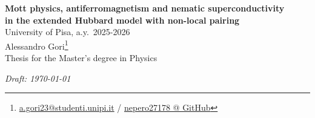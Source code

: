 \documentclass[a4paper]{memoir}
\begin{document}
	

\begin{center}
    {\bfseries {\Large Mott physics, antiferromagnetism and nematic superconductivity}} \\[0.8em]
    {\bfseries {\Large in the extended Hubbard model with non-local pairing}} \\[1em]
    \large University of Pisa, a.y.~2025-2026 \\[0.8em]
    Alessandro Gori\footnote{\href{mailto:a.gori23@studenti.unipi.it}{a.gori23@studenti.unipi.it} / \href{https://github.com/nepero27178}{nepero27178 @ GitHub}} \\[0.8em]
    \scriptsize Thesis for the Master's degree in Physics
    
\end{center}

\renewcommand*{\thefootnote}{\arabic{footnote}}
\setcounter{footnote}{0}

\begin{abstract}
    \todo
    \begin{itemize}
    	\item Last appendix
    	\item Figures in introduction
    \end{itemize}
\end{abstract}

\begin{KeepFromToc}		%
	\tableofcontents
\end{KeepFromToc}

\vfill
\begin{flushright}
	\textit{Draft: \today}
\end{flushright}
\clearpage

\clearpage					%



%
%
%
%
%
%
%

\appendix







\printbibliography\nocite{*}
\end{document}
